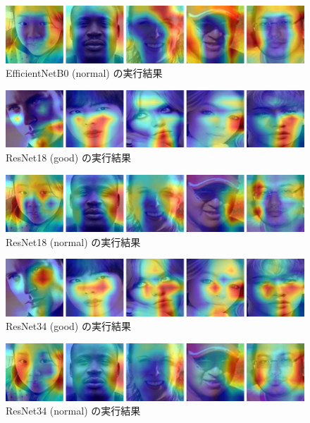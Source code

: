 \documentclass[a4paper,11pt,titlepage]{jsarticle}
\begin{document}
\begin{figure}[H]
    \centering
    \includegraphics[width=1.1\textwidth]{efficientnetb0(normal).jpg}
    \caption{EfficientNetB0 (normal) の実行結果}
    \label{fig:append_efficientnetb0(normal)}
\end{figure}

\begin{figure}[H]
    \centering
    \includegraphics[width=1.1\textwidth]{resent18(good).jpg}
    \caption{ResNet18 (good) の実行結果}
    \label{fig:append_resent18(good)}
\end{figure}

\begin{figure}[H]
    \centering
    \includegraphics[width=1.1\textwidth]{resnet18(normal).jpg}
    \caption{ResNet18 (normal) の実行結果}
    \label{fig:append_resnet18(normal)}
\end{figure}

\begin{figure}[H]
    \centering
    \includegraphics[width=1.1\textwidth]{resnet34(good).jpg}
    \caption{ResNet34 (good) の実行結果}
    \label{fig:append_resnet34(good)}
\end{figure}

\begin{figure}[H]
    \centering
    \includegraphics[width=1.1\textwidth]{resnet34(normal).jpg}
    \caption{ResNet34 (normal) の実行結果}
    \label{fig:append_resnet34(normal)}
\end{figure}
\end{document}
